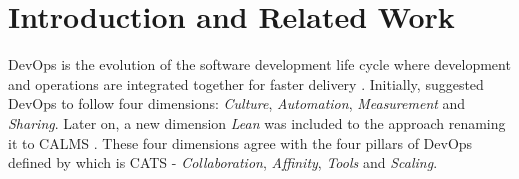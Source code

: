 \documentclass{sigchi}
\begin{document}
\section{Introduction and Related Work}


DevOps is the evolution of the software development life cycle where development and operations are integrated together for faster delivery \cite{bobrov2019teaching, huttermann2012devops}. Initially, \cite{humble2011enterprises} suggested DevOps to follow four dimensions: \textit{Culture}, \textit{Automation}, \textit{Measurement} and \textit{Sharing}. Later on, a new dimension \textit{Lean} was included to the approach renaming it to CALMS \cite{riley2014keep}. These four dimensions agree with the four pillars of DevOps defined by \cite{davis2016effective} which is CATS - \textit{Collaboration}, \textit{Affinity}, \textit{Tools} and \textit{Scaling}.
\end{document}
